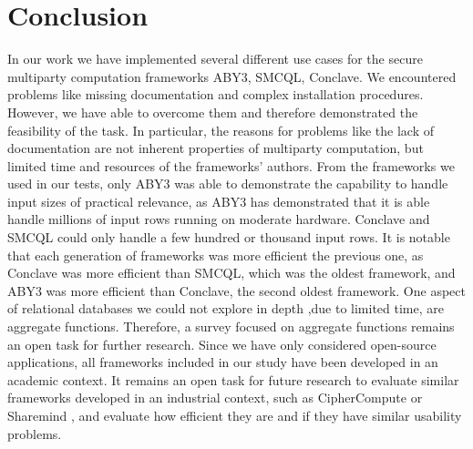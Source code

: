 \chapter{Conclusion}
 In our work we have implemented several different use cases for the secure multiparty computation frameworks ABY3, SMCQL, Conclave. We encountered problems like missing documentation and complex installation procedures. However, we have able to overcome them and therefore demonstrated the feasibility of the task. 
 In particular, the reasons for problems like the lack of documentation are not inherent properties of multiparty computation, but limited time and resources of the frameworks' authors. From the frameworks we used in our tests, only ABY3 was able to demonstrate the capability to handle input sizes of practical relevance, as ABY3 has demonstrated that it is able handle millions of input rows running on moderate hardware. Conclave and SMCQL could only handle a few hundred or thousand input rows. It is notable that each generation of frameworks was more efficient the previous one, as Conclave was more efficient than SMCQL, which was the oldest framework, and ABY3 was more efficient than Conclave, the second oldest framework.
 One aspect of relational databases we could not explore in depth ,due to limited time, are aggregate functions. Therefore, a survey focused on aggregate functions remains an open task for further research. 
 Since we have only considered open-source applications, all frameworks included in our study have been developed in an academic context. It remains an open task for future research to evaluate similar frameworks developed in an industrial context, such as CipherCompute or Sharemind \cite{bogdanov2008sharemind}, and evaluate how efficient they are and if they have similar usability problems. 

